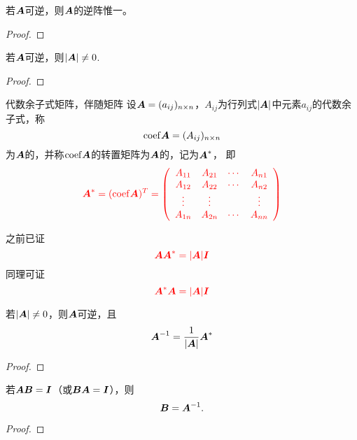 \begin{dingli}
  若$\boldsymbol{A}$可逆，则$\boldsymbol{A}$的逆阵惟一。
\end{dingli}

\begin{proof}
\end{proof}





\begin{dingli}
  若$\boldsymbol{A}$可逆，则$|\boldsymbol{A}|\ne 0$.
\end{dingli}
\begin{proof}

\end{proof}

\begin{dingyi}{代数余子式矩阵，伴随矩阵}
  设$\boldsymbol{A}=(a_{ij})_{n\times n}$，$A_{ij}$为行列式$|\boldsymbol{A}|$中元素$a_{ij}$的代数余子式，称
  $$
  \mathrm{coef} \boldsymbol{A} = (A_{ij})_{n\times n}
  $$
  为$\boldsymbol{A}$的，并称$\mathrm{coef} \boldsymbol{A}$的转置矩阵为$\boldsymbol{A}$的，记为$\boldsymbol{A}^*$，
  即
  $$\textcolor{red}{
    \boldsymbol{A}^* = (\mathrm{coef}\boldsymbol{A})^T = \left(
      \begin{array}{cccc}
        A_{11} & A_{21} & \cdots & A_{n1} \\
        A_{12} & A_{22} & \cdots & A_{n2} \\
        \vdots   & \vdots   &     & \vdots   \\
        A_{1n} & A_{2n} & \cdots & A_{nn} \\
      \end{array}
    \right)
  }
  $$
\end{dingyi}

之前已证
$$ \textcolor{red}{
  \boldsymbol{A}\boldsymbol{A}^* = |\boldsymbol{A}|\boldsymbol{I}
}
$$
同理可证
$$ \textcolor{red}{
  \boldsymbol{A}^*\boldsymbol{A} = |\boldsymbol{A}|\boldsymbol{I}
}
$$



\begin{dingli}
  若$|\boldsymbol{A}|\ne 0$，则$\boldsymbol{A}$可逆，且
  $$
  \boldsymbol{A}^{-1} = \frac1{|\boldsymbol{A}|} \boldsymbol{A}^*
  $$
\end{dingli}

\begin{proof}

\end{proof}



\begin{tuilun}
  若$\boldsymbol{A}\boldsymbol{B} = \boldsymbol{I}$（或$\boldsymbol{B}\boldsymbol{A}=\boldsymbol{I}$），则
  $$
  \boldsymbol{B} = \boldsymbol{A}^{-1}.
  $$
\end{tuilun}
\begin{proof}

\end{proof}

